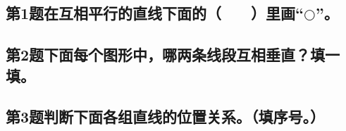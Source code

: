 \subsection*{第1题\quad 在互相平行的直线下面的（　　）里画“\(\bigcirc\)”。}
\subsection*{第2题\quad 下面每个图形中，哪两条线段互相垂直？填一填。}
\subsection*{第3题\quad 判断下面各组直线的位置关系。（填序号。）}
